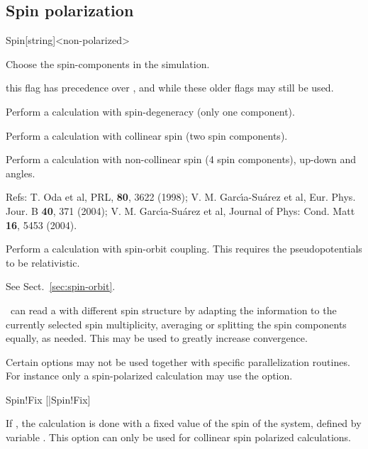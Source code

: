 \subsection{Spin polarization}


\begin{fdfentry}{Spin}[string]<non-polarized>

  Choose the spin-components in the simulation.

  \note this flag has precedence over ,  and
   while these older flags may still be used.
  \begin{fdfoptions}

    Perform a calculation with spin-degeneracy (only one component).

    \option[polarized]%
    Perform a calculation with collinear spin (two spin components).

    Perform a calculation with non-collinear spin (4 spin components),
    up-down and angles.

    Refs: T. Oda et al, PRL, \textbf{80}, 3622 (1998); 
    V. M. Garc\'{\i}a-Su\'arez et al, Eur. Phys. Jour. B \textbf{40}, 371 (2004);
    V. M. Garc\'{\i}a-Su\'arez et al, Journal of
    Phys: Cond. Matt \textbf{16}, 5453 (2004).

    Perform a calculation with spin-orbit coupling.  This requires the
    pseudopotentials to be relativistic.

    See Sect.~\ref{sec:spin-orbit}.

  \end{fdfoptions}

  \siesta\ can read a  with different spin structure by
  adapting the information to the currently selected spin
  multiplicity, averaging or splitting the spin components equally, as
  needed. This may be used to greatly increase convergence.

  Certain options may not be used together with specific
  parallelization routines.  For instance only a spin-polarized
  calculation may use the  option.

\end{fdfentry}

\begin{fdflogicalF}{Spin!Fix}
  [|Spin!Fix]

  If \fdftrue, the calculation is done with a fixed value of the spin
  of the system, defined by variable . This option can
  only be used for collinear spin polarized calculations.

\end{fdflogicalF}

